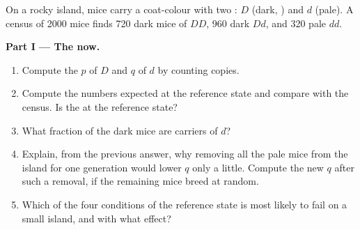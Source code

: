\begin{problem}
\label{pb:g12:selection-drift-speciation:1}
On a rocky island, mice carry a coat-colour  with two : $D$
(dark, ) and $d$ (pale). A census of 2000 mice finds 720 dark
mice of  $DD$, 960 dark $Dd$, and 320 pale $dd$.

\medskip
\noindent\textbf{Part I --- The  now.}
\begin{enumerate}
  \item Compute the  $p$ of $D$ and $q$ of $d$ by counting
        copies.
  \item Compute the  numbers expected at the reference state
        and compare with the census. Is the  at the reference
        state?
  \item What fraction of the dark mice are carriers of $d$?
  \item Explain, from the previous answer, why removing all the pale
        mice from the island for one generation would lower $q$ only a
        little. Compute the new $q$ after such a removal, if the
        remaining mice breed at random.
  \item Which of the four conditions of the reference state is most
        likely to fail on a small island, and with what effect?
\end{enumerate}


\end{problem}
